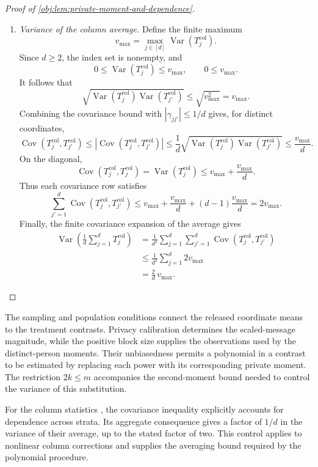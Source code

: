\documentclass[11pt]{article}
\begin{document}
\begin{proof}[Proof of \cref{obj:lem:private-moment-and-dependence}]
\begin{enumerate}
\item \textit{Variance of the column average.}
Define the finite maximum
\[
v_{\max}
=
\max_{j\in[d]}\operatorname{Var}(T_j^{\mathrm{col}}).
\]
Since \(d\ge2\), the index set is nonempty, and
\[
0\le\operatorname{Var}(T_j^{\mathrm{col}})\le v_{\max},
\qquad
0\le v_{\max}.
\]
It follows that
\[
\sqrt{\operatorname{Var}(T_j^{\mathrm{col}})
      \operatorname{Var}(T_{j'}^{\mathrm{col}})}
\le\sqrt{v_{\max}^2}=v_{\max}.
\]
Combining the covariance bound with
\(|\gamma_{jj'}|\le1/d\) gives, for distinct coordinates,
\[
\operatorname{Cov}(T_j^{\mathrm{col}},T_{j'}^{\mathrm{col}})
\le
\left|\operatorname{Cov}(T_j^{\mathrm{col}},T_{j'}^{\mathrm{col}})\right|
\le
\frac1d
\sqrt{\operatorname{Var}(T_j^{\mathrm{col}})
      \operatorname{Var}(T_{j'}^{\mathrm{col}})}
\le
\frac{v_{\max}}d.
\]
On the diagonal,
\[
\operatorname{Cov}(T_j^{\mathrm{col}},T_j^{\mathrm{col}})
=
\operatorname{Var}(T_j^{\mathrm{col}})
\le v_{\max}+\frac{v_{\max}}d.
\]
Thus each covariance row satisfies
\[
\sum_{j'=1}^d
\operatorname{Cov}(T_j^{\mathrm{col}},T_{j'}^{\mathrm{col}})
\le
v_{\max}+\frac{v_{\max}}d
+(d-1)\frac{v_{\max}}d
=
2v_{\max}.
\]
Finally, the finite covariance expansion of the average gives
\[
\begin{aligned}
\operatorname{Var}\left(\frac1d\sum_{j=1}^dT_j^{\mathrm{col}}\right)
&=
\frac1{d^2}\sum_{j=1}^d\sum_{j'=1}^d
\operatorname{Cov}(T_j^{\mathrm{col}},T_{j'}^{\mathrm{col}})\\
&\le
\frac1{d^2}\sum_{j=1}^d2v_{\max}\\
&=
\frac2d\,v_{\max}.
\end{aligned}
\]
\end{enumerate}
\end{proof}

The sampling and population conditions connect the released coordinate means to the treatment contrasts. Privacy calibration determines the scaled-message magnitude, while the positive block size supplies the observations used by the distinct-person moments. Their unbiasedness permits a polynomial in a contrast to be estimated by replacing each power with its corresponding private moment. The restriction \(2k\le m\) accompanies the second-moment bound needed to control the variance of this substitution.

For the column statistics , the covariance inequality explicitly accounts for dependence across strata. Its aggregate consequence gives a factor of \(1/d\) in the variance of their average, up to the stated factor of two. This control applies to nonlinear column corrections and supplies the averaging bound required by the polynomial procedure.
\end{document}
